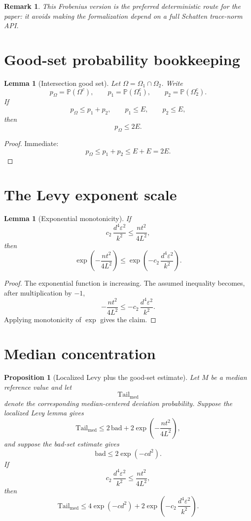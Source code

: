 \documentclass[11pt]{article}
\newtheorem{lemma}[theorem]{Lemma}
\newtheorem{proposition}[theorem]{Proposition}
\newtheorem{remark}[theorem]{Remark}
\newcommand{\bbP}{\mathbb{P}}
\newcommand{\OmegaGood}{\Omega}
\begin{document}
\begin{remark}
This Frobenius version is the preferred deterministic route for the paper:
it avoids making the formalization depend on a full Schatten trace-norm API.
\end{remark}

\section{Good-set probability bookkeeping}

\begin{lemma}[Intersection good set]
Let \(\OmegaGood=\Omega_1\cap\Omega_2\).  Write
\[
 p_\Omega=\bbP(\OmegaGood^c),\qquad
 p_1=\bbP(\Omega_1^c),\qquad
 p_2=\bbP(\Omega_2^c).
\]
If
\[
 p_\Omega\le p_1+p_2,\qquad p_1\le E,\qquad p_2\le E,
\]
then
\[
 p_\Omega\le 2E.
\]
\end{lemma}

\begin{proof}
Immediate:
\[
  p_\Omega\le p_1+p_2\le E+E=2E.
\]
\end{proof}

\section{The Levy exponent scale}

\begin{lemma}[Exponential monotonicity]
If
\[
  c_2\,\frac{d^4\varepsilon^2}{k^2}
  \le
  \frac{n t^2}{4L^2},
\]
then
\[
  \exp\!\left(-\frac{n t^2}{4L^2}\right)
  \le
  \exp\!\left(-c_2\,\frac{d^4\varepsilon^2}{k^2}\right).
\]
\end{lemma}

\begin{proof}
The exponential function is increasing.  The assumed inequality becomes, after
multiplication by \(-1\),
\[
  -\frac{n t^2}{4L^2}
  \le
  -c_2\,\frac{d^4\varepsilon^2}{k^2}.
\]
Applying monotonicity of \(\exp\) gives the claim.
\end{proof}

\section{Median concentration}

\begin{proposition}[Localized Levy plus the good-set estimate]
Let \(M\) be a median reference value and let
\[
  \mathrm{Tail}_{\mathrm{med}}
\]
denote the corresponding median-centered deviation probability.  Suppose the
localized Levy lemma gives
\[
 \mathrm{Tail}_{\mathrm{med}}
 \le
 2\,\mathrm{bad}
 +2\exp\!\left(-\frac{nt^2}{4L^2}\right),
\]
and suppose the bad-set estimate gives
\[
 \mathrm{bad}\le 2\exp(-c d^2).
\]
If
\[
 c_2\,\frac{d^4\varepsilon^2}{k^2}
 \le
 \frac{nt^2}{4L^2},
\]
then
\[
 \mathrm{Tail}_{\mathrm{med}}
 \le
 4\exp(-c d^2)
 +2\exp\!\left(-c_2\,\frac{d^4\varepsilon^2}{k^2}\right).
\]
\end{proposition}
\end{document}
